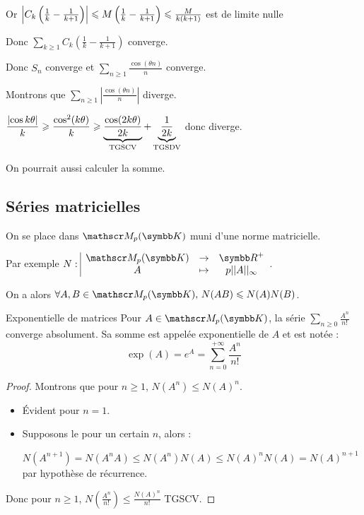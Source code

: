 Or $\left|C_k \left( \frac 1 k - \frac 1 {k + 1} \right)\right| \leqslant M \left( \frac 1 k - \frac 1 {k + 1} \right) \leqslant \frac M {k(k+1)}$
est de limite nulle 

Donc $\sum_{k \geqslant 1} C_k \left( \frac 1 k - \frac 1 {k + 1} \right)$ converge. 

Donc $S_n$ converge et $\sum_{n \geqslant 1 } \frac{\cos(\theta n)}{n}$ converge.

\lvspace Montrons que $\sum_{n \geqslant 1} \left| \frac{\cos(\theta n)}{n} \right|$ diverge. 

$\displaystyle \frac{\left|\cos{k \theta }\right|}{ k } \geqslant  \frac{\cos^2(k \theta )}{k } \geqslant \underbrace{\frac{\cos(2k \theta)}{2k}}_{\text{TGSCV}} + \underbrace{\frac{ 1 }{ 2 k }}_{\text{TGSDV}}$ 
donc diverge. 

\begin{remarque}
    On pourrait aussi calculer la somme.
\end{remarque}

\subsection{Séries matricielles}

On se place dans $\mathscr M_p(\K)$ muni d'une norme matricielle. 

Par exemple $\fonction N {\mathscr M_p(\K)} {\R^+} A {p ||A||_\infty}$. 

On a alors $\forall A, B \in \mathscr M_p(\K), \, N(AB) \leqslant N(A) N(B)$.

\begin{theoreme}{Exponentielle de matrices}{}
    Pour $A \in \mathscr M_p(\K)$, la série $\sum_{n \geqslant 0} \frac{A^n}{n!}$ converge absolument. 
    Sa somme est appelée exponentielle de $A$ et est notée :
    \[\displaystyle \exp(A) = e^A = \sum_{n = 0}^{+\infty} \frac{A^n}{n!}\]
\end{theoreme}


\begin{proof}
    Montrons que pour $n \geqslant 1$, $N(A^n) \leqslant N(A)^n$.

    \begin{itemize}
        \item Évident pour $n = 1$. 

        \item Supposons le pour un certain $n$, alors :

        $N(A^{n + 1}) = N(A^n A) \leqslant N(A^n) N(A) \leqslant N(A)^n N(A) = N(A)^{n + 1}$
        par hypothèse de récurrence.
    \end{itemize}

    Donc pour $n \geqslant 1$, $N\left( \frac{A^n}{n!} \right) \leqslant \frac{N(A)^n}{n!}$ TGSCV. 
\end{proof}

